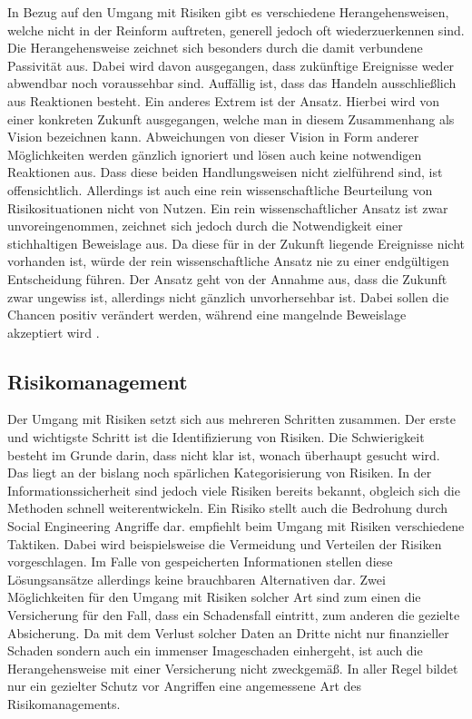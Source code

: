 In Bezug auf den Umgang mit Risiken gibt es verschiedene Herangehensweisen, welche nicht in der Reinform auftreten, generell jedoch oft wiederzuerkennen sind.
Die  Herangehensweise zeichnet sich besonders durch die damit verbundene Passivität aus.
Dabei wird davon ausgegangen, dass zukünftige Ereignisse weder abwendbar noch voraussehbar sind.
Auffällig ist, dass das Handeln ausschließlich aus Reaktionen besteht.
Ein anderes Extrem ist der  Ansatz.
Hierbei wird von einer konkreten Zukunft ausgegangen, welche man in diesem Zusammenhang als Vision bezeichnen kann.
Abweichungen von dieser Vision in Form anderer Möglichkeiten werden gänzlich ignoriert und lösen auch
keine notwendigen Reaktionen aus.
Dass diese beiden Handlungsweisen nicht zielführend sind, ist offensichtlich.
Allerdings ist auch eine rein wissenschaftliche Beurteilung von Risikosituationen nicht von Nutzen.
Ein rein wissenschaftlicher Ansatz ist zwar unvoreingenommen, zeichnet sich jedoch durch die
Notwendigkeit einer stichhaltigen Beweislage aus.
Da diese für in der Zukunft liegende Ereignisse nicht vorhanden ist, würde der rein wissenschaftliche
Ansatz nie zu einer endgültigen Entscheidung führen.
Der  Ansatz geht von der Annahme aus, dass die Zukunft zwar ungewiss ist, allerdings nicht gänzlich unvorhersehbar ist.
Dabei sollen die Chancen positiv verändert werden, während eine mangelnde Beweislage akzeptiert wird \citep{risikomanagement}.

\subsection{Risikomanagement}\label{sec:risikomanagement}
Der Umgang mit Risiken setzt sich aus mehreren Schritten zusammen.
Der erste und wichtigste Schritt ist die Identifizierung von Risiken.
Die Schwierigkeit besteht im Grunde darin, dass nicht klar ist, wonach überhaupt gesucht wird.
Das liegt an der bislang noch spärlichen Kategorisierung von Risiken.
In der Informationssicherheit sind jedoch viele Risiken bereits bekannt, obgleich sich die Methoden
schnell weiterentwickeln.
Ein Risiko stellt auch die Bedrohung durch Social Engineering Angriffe dar.
\citep{risikomanagement} empfiehlt beim Umgang mit Risiken verschiedene Taktiken.
Dabei wird beispielsweise die Vermeidung und Verteilen der Risiken vorgeschlagen.
Im Falle von gespeicherten Informationen stellen diese Lösungsansätze allerdings keine brauchbaren
Alternativen dar.
Zwei Möglichkeiten für den Umgang mit Risiken solcher Art sind zum einen die Versicherung für den
Fall, dass ein Schadensfall eintritt, zum anderen die gezielte Absicherung.
Da mit dem Verlust solcher Daten an Dritte nicht nur finanzieller Schaden sondern auch ein immenser
Imageschaden einhergeht, ist auch die Herangehensweise mit einer Versicherung nicht zweckgemäß.
In aller Regel bildet nur ein gezielter Schutz vor Angriffen eine angemessene Art des
Risikomanagements.

